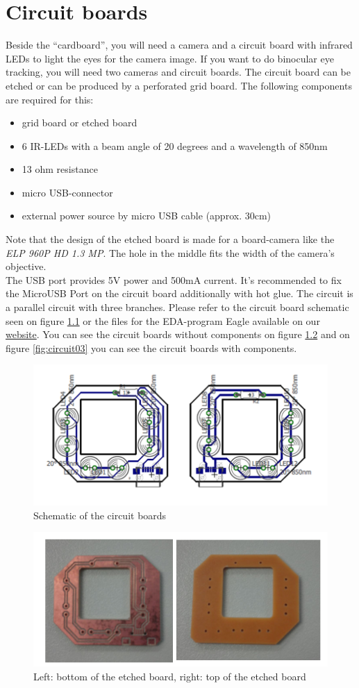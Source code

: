 \documentclass[../../Hardware_Guide]{subfiles}
\begin{document}
\chapter{Circuit boards}\label{platines}
Beside the ``cardboard'', you will need a camera and a circuit board with infrared LEDs to light the eyes for the camera image. If you want to do binocular eye tracking, you will need two cameras and circuit boards. The circuit board can be etched or can be produced by a perforated grid board. The following components are required for this:
\begin{itemize}
	\item grid board or etched board
	\item 6 IR-LEDs with a beam angle of 20 degrees and a wavelength of 850nm
	\item 13 ohm resistance
	\item micro USB-connector
	\item external power source by micro USB cable (approx. 30cm)
\end{itemize}
Note that the design of the etched board is made for a board-camera like the \textit{ELP 960P HD 1.3 MP}. The hole in the middle fits the width of the camera's objective.\\
The USB port provides 5V power and 500mA current. It's recommended to fix the MicroUSB Port on the circuit board additionally with hot glue. The circuit is a parallel circuit with three branches. Please refer to the circuit board schematic seen on figure \ref{fig:circuit01} or the files for the EDA-program Eagle available on our \href{http://www.bullseye.uol.de}{website}. You can see the circuit boards without components on figure \ref{fig:circuit02} and on figure \ref{fig:circuit03} you can see the circuit boards with components.
\begin{figure}[h]
	\centering
	\includegraphics[width=0.7\linewidth]{1}
	\caption{Schematic of the circuit boards}
	\label{fig:circuit01}
\end{figure}
\begin{figure}[h]
	\centering
	\includegraphics[width=0.7\linewidth]{2}
	\caption{Left: bottom of the etched board, right: top of the etched board}
	\label{fig:circuit02}
\end{figure}
\end{document}
